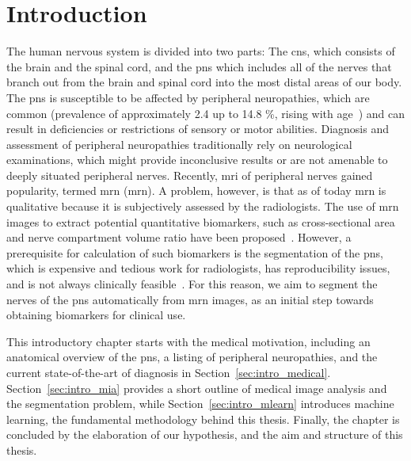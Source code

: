 \chapter{Introduction} %
The human nervous system is divided into two parts: The \gls{cns}, which consists of the brain and the spinal cord, and the \gls{pns} which includes all of the nerves that branch out from the brain and spinal cord into the most distal areas of our body. The \gls{pns} is susceptible to be affected by peripheral neuropathies, which are common (prevalence of approximately 2.4 up to 14.8 \%, rising with age~\cite{Martyn1997EpidemiologyNeuropathy,Gregg2004PrevalenceSurvey}) and can result in deficiencies or restrictions of sensory or motor abilities. Diagnosis and assessment of peripheral neuropathies traditionally rely on neurological examinations, which might provide inconclusive results or are not amenable to deeply situated peripheral nerves. Recently, \gls{mri} of peripheral nerves gained popularity, termed \acrlong{mrn} (\acrshort{mrn}). A problem, however, is that as of today \acrshort{mrn} is qualitative because it is subjectively assessed by the radiologists. The use of \acrshort{mrn} images to extract potential quantitative biomarkers, such as cross-sectional area and nerve compartment volume ratio have been proposed~\cite{Kronlage2017,Felisaz2016NerveMicro-neurography,Felisaz2017MRNeuropathy.,Balsiger2018SegmentationApproach}. However, a prerequisite for calculation of such biomarkers is the segmentation of the \gls{pns}, which is expensive and tedious work for radiologists, has reproducibility issues, and is not always clinically feasible~\cite{Porz2014Multi-modalMachine,Gillies2016Radiomics:Data}. For this reason, we aim to segment the nerves of the \gls{pns} automatically from \acrshort{mrn} images, as an initial step towards obtaining biomarkers for clinical use.

This introductory chapter starts with the medical motivation, including an anatomical overview of the \gls{pns}, a listing of peripheral neuropathies, and the current state-of-the-art of diagnosis in Section~\ref{sec:intro_medical}. Section~\ref{sec:intro_mia} provides a short outline of medical image analysis and the segmentation problem, while  Section~\ref{sec:intro_mlearn} introduces machine learning, the fundamental methodology behind this thesis. Finally, the chapter is concluded by the elaboration of our hypothesis, and the aim and structure of this thesis.

